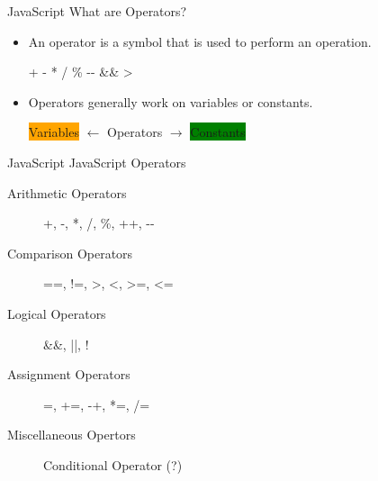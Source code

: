 \documentclass[14pt]{beamer}
\begin{document}
\begin{frame}{JavaScript}
What are Operators?
\begin{itemize}
 \item An operator is a symbol that is used to perform an operation.
       
       + - * / \% \mbox{-}\mbox{-} \&\& >

 \item Operators generally work on variables or constants.
 
 \colorbox{orange}{Variables} $\leftarrow$ \colorbox{light-gray}{Operators} $\rightarrow$ \colorbox{green}{Constants}
\end{itemize}

\end{frame}

\begin{frame}{JavaScript}
JavaScript Operators

\vspace{1pc}
\begin{description}
 \item [Arithmetic Operators] +, -, *, /, \%, ++, \mbox{-}\mbox{-}
 \item [Comparison Operators] ==, !=, >, <, >=, <= 
 \item [Logical Operators] \&\&, ||, ! 
 \item [Assignment Operators] =, +=, -+, *=, /=
 \item [Miscellaneous Opertors] Conditional Operator (?)
\end{description}
\end{frame}
\end{document}
